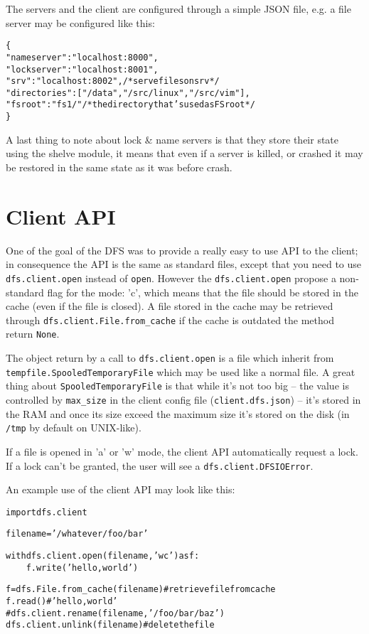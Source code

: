 \documentclass[12pt,a4paper]{report}
\begin{document}
	The servers and the client are configured through a simple JSON file, e.g. a file server may be configured like this:
	
	\begin{alltt}
		\rmfamily
		
		\{
    	"nameserver": "localhost:8000",
    	"lockserver": "localhost:8001",
    	"srv": "localhost:8002", /* serve files on srv */
    	"directories": ["/data", "/src/linux", "/src/vim"],
    	"fsroot": "fs1/" /* the directory that's used as FS root */
		\}
	\end{alltt}
	
	A last thing to note about lock \& name servers is that they store their state using the shelve module, it means that even if a server is killed, or crashed it may be restored in the same state as it was before crash.
		
	\section*{Client API}
	
		One of the goal of the DFS was to provide a really easy to use API to the client; in consequence the API is the same as standard files, except that you need to use \texttt{dfs.client.open} instead of \texttt{open}. However the \texttt{dfs.client.open} propose a non-standard flag for the mode: 'c', which means that the file should be stored in the cache (even if the file is closed). A file stored in the cache may be retrieved through \texttt{dfs.client.File.from\_cache} if the cache is outdated the method return \texttt{None}.
		
		The object return by a call to \texttt{dfs.client.open} is a file which inherit from \texttt{tempfile.SpooledTemporaryFile} which may be used like a normal file. A great thing about \texttt{SpooledTemporaryFile} is that while it's not too big -- the value is controlled by \texttt{max\_size} in the client config file (\texttt{client.dfs.json}) -- it's stored in the RAM and once its size exceed the maximum size it's stored on the disk (in \texttt{/tmp} by default on UNIX-like).
		
		If a file is opened in 'a' or 'w' mode, the client API automatically request a lock. If a lock can't be granted, the user will see a \texttt{dfs.client.DFSIOError}.
		
		An example use of the client API may look like this:
		
		\begin{alltt}
			\rmfamily
			
			import dfs.client

			filename = '/whatever/foo/bar'			
			
			with dfs.client.open(filename, 'wc') as f:
			\ \ \ \ f.write('hello, world')
				
			f = dfs.File.from\_cache(filename) # retrieve file from cache
			f.read() # 'hello, world'
			# dfs.client.rename(filename, '/foo/bar/baz')
			dfs.client.unlink(filename) # delete the file
		\end{alltt}
	
\end{document}

